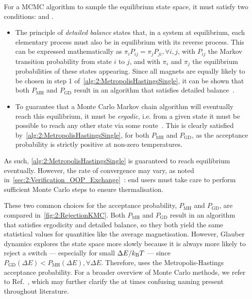 For a MCMC algorithm to sample the equilibrium state space, it must satisfy two conditions:  and .
\begin{itemize}
	\item The principle of \textit{detailed balance} states that, in a system at equilibrium, each elementary process must also be in equilibrium with its reverse process.
	This can be expressed mathematically as $\pi_i P_{ij} = \pi_j P_{ji}, \forall i,j$, with $P_{ij}$ the Markov transition probability from state $i$ to $j$, and with $\pi_i$ and $\pi_j$ the equilibrium probabilities of these states appearing.
	Since all magnets are equally likely to be chosen in step 1 of~\cref{alg:2:MetropolisHastingsSingle}, it can be shown that both $P_\mathrm{MH}$ and $P_\mathrm{GD}$ result in an algorithm that satisfies detailed balance~\cite{kyimba2006comparisonIsingAlgorithms}.
	\item To guarantee that a Monte Carlo Markov chain algorithm will eventually reach this equilibrium, it must be \textit{ergodic}, i.e. from a given state it must be possible to reach any other state via some route~\cite{kyimba2006comparisonIsingAlgorithms}.
	This is clearly satisfied by~\cref{alg:2:MetropolisHastingsSingle}, for both $P_\mathrm{MH}$ and $P_\mathrm{GD}$, as the acceptance probability is strictly positive at non-zero temperatures.
\end{itemize}
As such, \cref{alg:2:MetropolisHastingsSingle} is guaranteed to reach equilibrium eventually.
However, the rate of convergence may vary, as noted in~\cref{sec:2:Verification_OOP_Exchange}~\cite{jang2004stochastic}: end users must take care to perform sufficient Monte Carlo steps to ensure thermalisation. %


These two common choices for the acceptance probability, $P_\mathrm{MH}$ and $P_\mathrm{GD}$, are compared in~\cref{fig:2:RejectionKMC}.
Both $P_\mathrm{MH}$ and $P_\mathrm{GD}$ result in an algorithm that satisfies ergodicity and detailed balance, so they both yield the same statistical values for quantities like the average magnetisation.
However, Glauber dynamics explores the state space more slowly because it is always more likely to reject a switch --- especially for small $\Delta E / \kBT$ --- since $P_\mathrm{GD}(\Delta E) < P_\mathrm{MH}(\Delta E), \forall \Delta E$.
Therefore, \hotspice uses the Metropolis-Hastings acceptance probability.
For a broader overview of Monte Carlo methods, we refer to Ref.~\cite{IntroductionMC}, which may further clarify the at times confusing naming present throughout literature.

